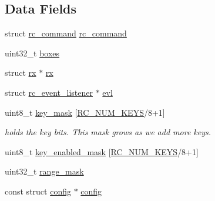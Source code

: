 \subsection*{Data Fields}
\begin{DoxyCompactItemize}
\item 
struct \hyperlink{structrc__command}{rc\+\_\+command} \hyperlink{structrc_a4b0d090708f7ecc11b7b626a799a17aa}{rc\+\_\+command}
\item 
uint32\+\_\+t \hyperlink{structrc_a8affeb79d786c16752fde7dc1758eb36}{boxes}
\item 
struct \hyperlink{structrx}{rx} $\ast$ \hyperlink{structrc_adc90118df1a6cf987c36268c9fa4eb75}{rx}
\item 
struct \hyperlink{structrc__event__listener}{rc\+\_\+event\+\_\+listener} $\ast$ \hyperlink{structrc_aa9d91f7afe038418779187d52e0eeb22}{evl}
\item 
uint8\+\_\+t \hyperlink{structrc_a2fb4afd6728a7c78922c6facb548e658}{key\+\_\+mask} \mbox{[}\hyperlink{rc_8h_ae3f7a6474966dabf22159d8d834fa84ba363dbd024bb0d0992a440ec82d97bd2a}{R\+C\+\_\+\+N\+U\+M\+\_\+\+K\+E\+Y\+S}/8+1\mbox{]}
\begin{DoxyCompactList}\small\item\em holds the key bits. This mask grows as we add more keys. \end{DoxyCompactList}\item 
uint8\+\_\+t \hyperlink{structrc_adbe93bdd991cf5dce29b8a560ebd5176}{key\+\_\+enabled\+\_\+mask} \mbox{[}\hyperlink{rc_8h_ae3f7a6474966dabf22159d8d834fa84ba363dbd024bb0d0992a440ec82d97bd2a}{R\+C\+\_\+\+N\+U\+M\+\_\+\+K\+E\+Y\+S}/8+1\mbox{]}
\item 
uint32\+\_\+t \hyperlink{structrc_a313a29909162376cedd0bf1b59e623df}{range\+\_\+mask}
\item 
const struct \hyperlink{structconfig}{config} $\ast$ \hyperlink{structrc_a4cf950c3fbd19e35a743adeb6ae06031}{config}
\end{DoxyCompactItemize}


